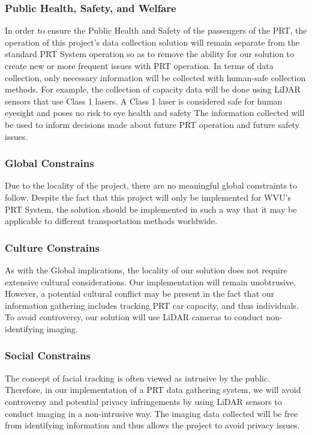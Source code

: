 \subsubsection{Public Health, Safety, and Welfare}
In order to ensure the Public Health and Safety of the passengers of the PRT, the operation of this project’s data collection solution will remain separate from the standard PRT System operation so as to remove the ability for our solution to create new or more frequent issues with PRT operation. 
In terms of data collection, only necessary information will be collected with human-safe collection methods. 
For example, the collection of capacity data will be done using LiDAR sensors that use Class 1 lasers. 
A Class 1 laser is considered safe for human eyesight and poses no risk to eye health and safety
The information collected will be used to inform decisions made about future PRT operation and future safety issues.

\subsubsection{Global Constrains}
Due to the locality of the project, there are no meaningful global constraints to follow. 
Despite the fact that this project will only be implemented for WVU’s PRT System, the solution should be implemented in such a way that it may be applicable to different transportation methods worldwide.

\subsubsection{Culture Constrains}
As with the Global implications, the locality of our solution does not require extensive cultural considerations. 
Our implementation will remain unobtrusive. 
However, a potential cultural conflict may be present in the fact that our information gathering includes tracking PRT car capacity, and thus individuals. 
To avoid controversy, our solution will use LiDAR cameras to conduct non-identifying imaging.

\subsubsection{Social Constrains}
The concept of facial tracking is often viewed as intrusive by the public. 
Therefore, in our implementation of a PRT data gathering system, we will avoid controversy and potential privacy infringements by using LiDAR sensors to conduct imaging in a non-intrusive way. 
The imaging data collected will be free from identifying information and thus allows the project to avoid privacy issues. 


